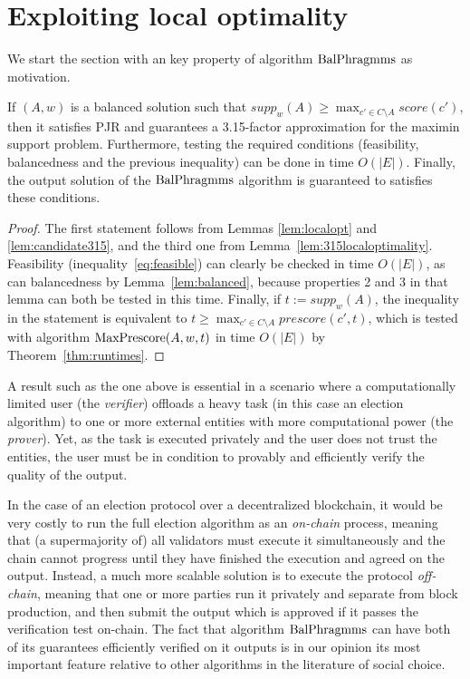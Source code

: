 \section{Exploiting local optimality}\label{s:local}

We start the section with an key property of algorithm $\operatorname{BalPhragmms}$ as motivation.

\begin{theorem}\label{thm:315guarantee}
If $(A,w)$ is a balanced solution such that $supp_w(A)\geq \max_{c'\in C\setminus A} score(c')$, then it satisfies PJR and guarantees a 3.15-factor approximation for the maximin support problem. 
Furthermore, testing the required conditions (feasibility, balancedness and the previous inequality) can be done in time $O(|E|)$. 
Finally, the output solution of the $\operatorname{BalPhragmms}$ algorithm is guaranteed to satisfies these conditions.
\end{theorem}
\begin{proof}
The first statement follows from Lemmas \ref{lem:localopt} and \ref{lem:candidate315}, and the third one from Lemma~\ref{lem:315localoptimality}. 
Feasibility (inequality~\ref{eq:feasible}) can clearly be checked in time $O(|E|)$, as can balancedness by Lemma~\ref{lem:balanced}, because properties 2 and 3 in that lemma can both be tested in this time. 
Finally, if $t:=supp_w(A)$, the inequality in the statement is equivalent to $t\geq \max_{c'\in C\setminus A} prescore(c',t)$, which is tested with algorithm $\operatorname{MaxPrescore}(A,w,t)$ in time $O(|E|)$ by Theorem~\ref{thm:runtimes}.
\end{proof}

A result such as the one above is essential in a scenario where a computationally limited user (the \emph{verifier}) offloads a heavy task (in this case an election algorithm) to one or more external entities with more computational power (the \emph{prover}). Yet, as the task is executed privately and the user does not trust the entities, the user must be in condition to provably and efficiently verify the quality of the output.


In the case of an election protocol over a decentralized blockchain, it would be very costly to run the full election algorithm as an \emph{on-chain} process, meaning that (a supermajority of) all validators must execute it simultaneously and the chain cannot progress until they have finished the execution and agreed on the output. 
Instead, a much more scalable solution is to execute the protocol \emph{off-chain}, meaning that one or more parties run it privately and separate from block production, and then submit the output which is approved if it passes the verification test on-chain. 
The fact that algorithm $\operatorname{BalPhragmms}$ can have both of its guarantees efficiently verified on it outputs is in our opinion its most important feature relative to other algorithms in the literature of social choice. 

